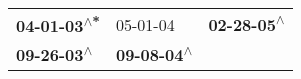\begin{supertabular}{lll}
 \textbf{04-01-03\textsuperscript{$\wedge$*}} &                   05-01-04\textsuperscript{} &  \textbf{02-28-05\textsuperscript{$\wedge$}} \\
  \textbf{09-26-03\textsuperscript{$\wedge$}} &  \textbf{09-08-04\textsuperscript{$\wedge$}} &                                              \\
\end{supertabular}
